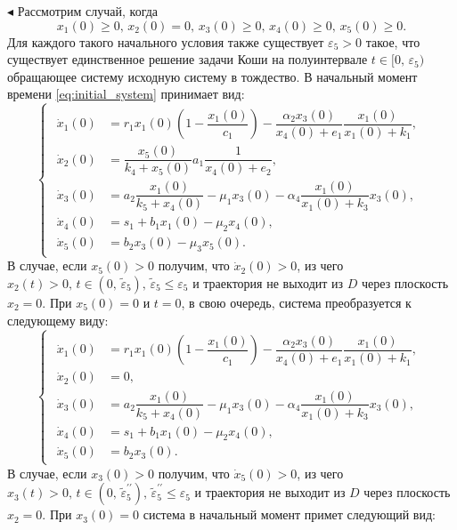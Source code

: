 \documentclass[12pt,a4paper]{extarticle}
\renewenvironment{proof}{\noindent$\blacktriangleleft$}{}
\theoremstyle{definition}
\theoremstyle{definition}
\theoremstyle{definition}
\begin{document}
\begin{proof}
		Рассмотрим случай, когда
		\begin{equation}\label{eq:conds_5}
			x_1(0)\ge0,\, x_2(0)=0,\, x_3(0)\ge0,\, x_4(0)\ge0,\, x_5(0)\ge0.
		\end{equation}
		Для каждого такого начального условия также существует $\varepsilon_5>0$ такое, что существует единственное решение задачи Коши на полуинтервале $t\in[0,\,\varepsilon_5)$ обращающее систему исходную систему в тождество. В начальный момент времени \ref{eq:initial_system} принимает вид: 
		\begin{equation*}
			\begin{cases}
				\begin{aligned}
					\dot{x}_1(0) &= r_1x_1(0)\left(1-\dfrac{x_1(0)}{c_1}\right)-\dfrac{\alpha_2x_3(0)}{x_4(0)+e_1}\dfrac{x_1(0)}{x_1(0)+k_1},\\
					\dot{x}_2(0) &= \dfrac{x_5(0)}{k_4+x_5(0)}a_1\dfrac{1}{x_4(0)+e_2},\\
					\dot{x}_3(0) &= a_2\dfrac{x_1(0)}{k_5+x_4(0)}-\mu_1x_3(0)-\alpha_4\dfrac{x_1(0)}{x_1(0)+k_3}x_3(0),\\
					\dot{x}_4(0) &= s_1 + b_1x_1(0)-\mu_2x_4(0),\\
					\dot{x}_5(0) &= b_2x_3(0)-\mu_3x_5(0).
				\end{aligned}
			\end{cases}
		\end{equation*} 
		В случае, если $x_5(0)>0$ получим, что $\dot{x}_2(0)>0$, из чего $x_2(t)>0,\, t\in(0,\, \tilde{\varepsilon}_5),\,\tilde{\varepsilon}_5\le\varepsilon_5$ и траектория не выходит из $D$ через плоскость $x_2=0$. При $x_5(0)=0$ и $t=0$, в свою очередь, система преобразуется к следующему виду:
		\begin{equation*}
			\begin{cases}
				\begin{aligned}
					\dot{x}_1(0) &= r_1x_1(0)\left(1-\dfrac{x_1(0)}{c_1}\right)-\dfrac{\alpha_2x_3(0)}{x_4(0)+e_1}\dfrac{x_1(0)}{x_1(0)+k_1},\\
					\dot{x}_2(0) &= 0,\\
					\dot{x}_3(0) &= a_2\dfrac{x_1(0)}{k_5+x_4(0)}-\mu_1x_3(0)-\alpha_4\dfrac{x_1(0)}{x_1(0)+k_3}x_3(0),\\
					\dot{x}_4(0) &= s_1 + b_1x_1(0)-\mu_2x_4(0),\\
					\dot{x}_5(0) &= b_2x_3(0).
				\end{aligned}
			\end{cases}
		\end{equation*}  
		В случае, если $x_3(0)>0$ получим, что $\dot{x}_5(0)>0$, из чего $x_3(t)>0,\, t\in(0,\, \tilde{\varepsilon}^{\prime\prime}_5),\,\tilde{\varepsilon}^{\prime\prime}_5\le\varepsilon_5$ и траектория не выходит из $D$ через плоскость $x_2=0$. При $x_3(0)=0$ система в начальный момент примет следующий вид:

\end{proof}
\end{document}
